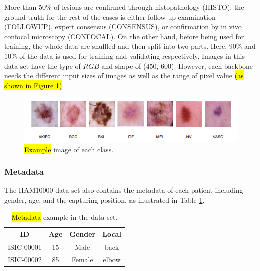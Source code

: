 \documentclass[sensors,article,accept,pdftex,moreauthors]{Definitions/mdpi}
\begin{document}
	
	More than 50\% of lesions are confirmed through histopathology (HISTO); the ground truth for the rest of the cases is either follow-up examination (FOLLOWUP), expert consensus (CONSENSUS), or confirmation by in vivo confocal microscopy (CONFOCAL). On the other hand, before being used for training, the whole data are shuffled and then split into two parts. Here, $90$\% and $10$\% of the data is used for training and validating respectively. Images in this data set have the type of $RGB$ and shape of (450, 600). However, each backbone needs the different input sizes of images as well as the range of pixel value \hl{(as shown in Figure \mbox{\ref{fig:data-sample}})}.
	\begin{figure}[H]
		\includegraphics[width=0.8\linewidth]{Definitions/DataDistribution}
		\caption{\hl{Example} %
 image of each class.}
		\label{fig:data-sample}
	\end{figure}	
	
	\subsubsection{Metadata}
	The HAM10000 data set \cite{10417} also contains the metadata of each patient including gender, age, and the capturing position, as illustrated in Table \ref{table:metadata sample}.
	\begin{table}[H]
		\caption{\hl{Metadata}  example in the data set.}%
		\label{table:metadata sample}
		\setlength{\tabcolsep}{11.8mm}\begin{tabular}{c c c c } 
\toprule
\textbf{ID} & \textbf{Age} & \textbf{Gender} & \textbf{Local}\\ 
\midrule
ISIC-00001 & 15 & Male & back\\
\midrule
ISIC-00002 & 85 & Female & elbow\\
\bottomrule
		\end{tabular}
	\end{table}
\end{document}
